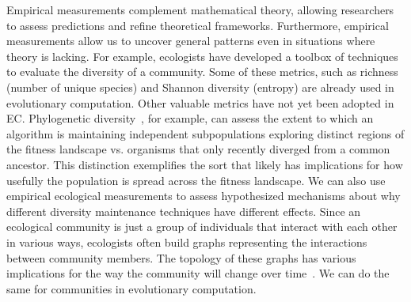 Empirical measurements complement mathematical theory, allowing researchers to assess predictions and refine theoretical frameworks. 
Furthermore, empirical measurements allow us to uncover general patterns even in situations where theory is lacking. 
For example, ecologists have developed a toolbox of techniques to evaluate the diversity of a community.
Some of these metrics, such as richness (number of unique species) and Shannon diversity (entropy) are already used %
in evolutionary computation.
Other valuable metrics have not yet been adopted in EC. %
Phylogenetic diversity~\cite{winter_phylogenetic_2013}, for example, can assess the extent to which an algorithm is maintaining independent subpopulations exploring distinct regions of the fitness landscape vs. organisms that only recently diverged from a common ancestor.
This distinction exemplifies the sort that likely has implications for how usefully the population is spread across the fitness landscape. We can also use empirical ecological measurements to assess hypothesized mechanisms about why different diversity maintenance techniques have different effects. Since an ecological community is just a group of individuals that interact with each other in various ways, ecologists often build graphs representing the interactions between community members. The topology of these graphs has various implications for the way the community will change over time~\cite{fontaine_ecological_2011}. We can do the same for communities in evolutionary computation.

